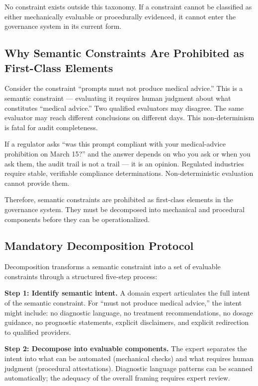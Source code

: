 No constraint exists outside this taxonomy. If a constraint cannot be classified as either mechanically evaluable or procedurally evidenced, it cannot enter the governance system in its current form.

\subsection{Why Semantic Constraints Are Prohibited as First-Class Elements}


Consider the constraint ``prompts must not produce medical advice.'' This is a semantic constraint --- evaluating it requires human judgment about what constitutes ``medical advice.'' Two qualified evaluators may disagree. The same evaluator may reach different conclusions on different days. This non-determinism is fatal for audit completeness.

If a regulator asks ``was this prompt compliant with your medical-advice prohibition on March 15?'' and the answer depends on who you ask or when you ask them, the audit trail is not a trail --- it is an opinion. Regulated industries require stable, verifiable compliance determinations. Non-deterministic evaluation cannot provide them.

Therefore, semantic constraints are prohibited as first-class elements in the governance system. They must be decomposed into mechanical and procedural components before they can be operationalized.

\subsection{Mandatory Decomposition Protocol}


Decomposition transforms a semantic constraint into a set of evaluable constraints through a structured five-step process:

\textbf{Step 1: Identify semantic intent.} A domain expert articulates the full intent of the semantic constraint. For ``must not produce medical advice,'' the intent might include: no diagnostic language, no treatment recommendations, no dosage guidance, no prognostic statements, explicit disclaimers, and explicit redirection to qualified providers.

\textbf{Step 2: Decompose into evaluable components.} The expert separates the intent into what can be automated (mechanical checks) and what requires human judgment (procedural attestations). Diagnostic language patterns can be scanned automatically; the adequacy of the overall framing requires expert review.

